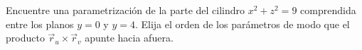 Encuentre una parametrización de la parte del cilindro $x^2+z^2=9$ comprendida entre los planos $y=0$ y $y=4$. Elija el orden de los parámetros de modo que el producto $\vec r_u\times\vec r_v$ apunte hacia afuera.

